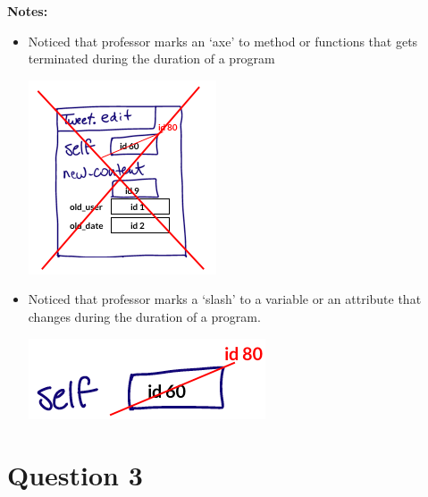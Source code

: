 \documentclass[12pt]{article}
\begin{document}
\begin{itemize}
    \bigskip

    \textbf{Notes:}

    \begin{itemize}
        \item Noticed that professor marks an `axe' to method or functions that
        gets terminated during the duration of a program

        \begin{center}
        \includegraphics[width=0.3\linewidth]{images/worksheet_3_q2_note.png}
        \end{center}

        \item Noticed that professor marks a `slash' to a variable or an attribute that
        changes during the duration of a program.

        \begin{center}
        \includegraphics[width=0.3\linewidth]{images/worksheet_3_q2_note2.png}
        \end{center}
     \end{itemize}
\end{itemize}

\section*{Question 3}
\end{document}
